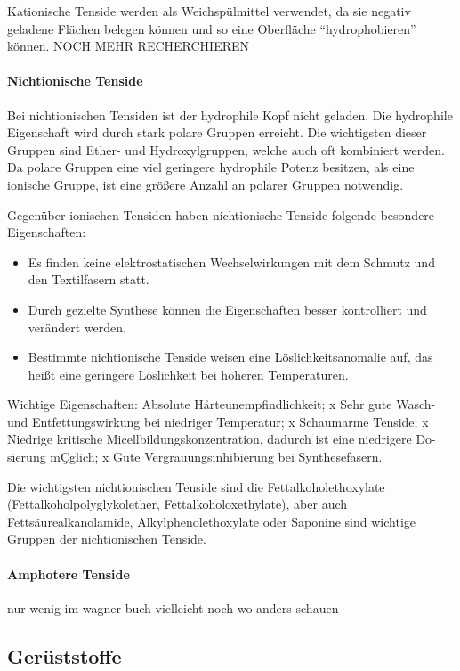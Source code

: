 \documentclass[main.tex]{subfiles}
\begin{document}
Kationische Tenside werden als Weichspülmittel verwendet, da sie negativ geladene Flächen belegen können und so eine Oberfläche "`hydrophobieren"' können. NOCH MEHR RECHERCHIEREN

\paragraph{Nichtionische Tenside}

Bei nichtionischen Tensiden ist der hydrophile Kopf nicht geladen. Die hydrophile Eigenschaft wird durch stark polare Gruppen erreicht. Die wichtigsten dieser Gruppen sind Ether- und Hydroxylgruppen, welche auch oft kombiniert werden. Da polare Gruppen eine viel geringere hydrophile Potenz besitzen, als eine ionische Gruppe, ist eine größere Anzahl an polarer Gruppen notwendig.

Gegenüber ionischen Tensiden haben nichtionische Tenside folgende besondere Eigenschaften:

\begin{itemize}
	\item Es finden keine elektrostatischen Wechselwirkungen mit dem Schmutz und den Textilfasern statt.
	\item Durch gezielte Synthese können die Eigenschaften besser kontrolliert und verändert werden.
	\item Bestimmte nichtionische Tenside weisen eine Löslichkeitsanomalie auf, das heißt eine geringere Löslichkeit bei höheren Temperaturen.
\end{itemize}

Wichtige Eigenschaften:
Absolute Hårteunempfindlichkeit;
x Sehr gute Wasch- und Entfettungswirkung bei niedriger Temperatur;
x Schaumarme Tenside;
x Niedrige kritische Micellbildungskonzentration, dadurch ist eine niedrigere Do-
sierung mÇglich;
x Gute Vergrauungsinhibierung bei Synthesefasern.

Die wichtigsten nichtionischen Tenside sind die Fettalkoholethoxylate (Fettalkoholpolyglykolether, Fettalkoholoxethylate), aber auch Fettsäurealkanolamide, Alkylphenolethoxylate oder Saponine sind wichtige Gruppen der nichtionischen Tenside.

\paragraph{Amphotere Tenside}

nur wenig im wagner buch vielleicht noch wo anders schauen

\subsection{Gerüststoffe}
\end{document}
